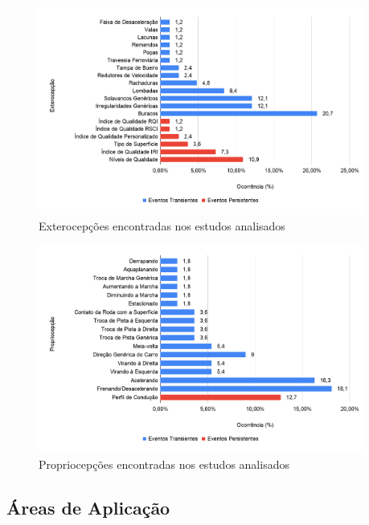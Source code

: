 \begin{figure}[h!]
  \centering
  \caption{Exterocepções encontradas nos estudos analisados}
   \label{fig:exteroperception_occurrence}
   \includegraphics[width=0.95\textwidth]{figuras/fig_20.png}
\end{figure}

\begin{figure}[h!]
  \centering
  \caption{Propriocepções encontradas nos estudos analisados}
   \label{fig:proprioception_occurrence}
   \includegraphics[width=0.95\textwidth]{figuras/fig_21.png}
\end{figure}

\subsection{Áreas de Aplicação}

